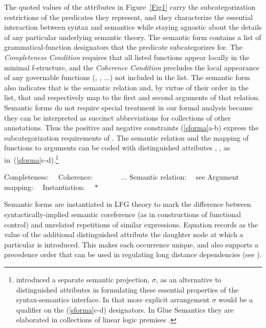 \documentclass[output=paper,hidelinks]{langscibook}
\begin{document}
The quoted values of the  attributes in Figure~\ref{Fig1} carry the subcategorization restrictions of the predicates they represent, and they characterize the essential interaction between syntax and semantics while staying agnostic about the details of any particular underlying semantic theory. The semantic form  contains a list of grammatical-function designators that the predicate subcategorizes for.  The \emph{Completeness Condition} requires that all listed functions appear locally in the minimal f-structure, and the \emph{Coherence Condition} precludes the local appearance of any governable functions (, , ...) not included in the list. The semantic form also indicates that  is the semantic relation and, by virtue of their order in the list, that   and  respectively map to the first and second arguments of that relation. Semantic forms do not require special treatment in our formal analysis because they can be interpreted as succinct abbreviations for collections of other annotations. Thus the positive and negative constraints \mbox{(\ref{sforma}a-b)} express the subcategorization requirements of .   The semantic relation and the mapping of functions to arguments can be coded with distinguished attributes , ,  as in~\mbox{(\ref{sforma}c-d)}.\footnote{\citet{HalvorsenKaplan1988} introduced a separate semantic projection, $\sigma$, as an alternative to distinguished attributes in formulating these essential properties of the syntax-semantics interface. In that more explicit arrangement $\sigma$ would be a qualifier on the (\ref{sforma}c-d) designators.  In Glue Semantics they are elaborated in collections of linear logic premises \citep{dalrympleetal93,Dalrymple:Glue}.}

\ea\label{sforma}
\ea\label{ex:computational:completeness} Completeness:\ \   \hsp{1em} 
\ex\label{ex:computational:coherence} Coherence:\ \    \ \    \ \    ...
\ex\label{ex:computational:relation} Semantic relation:\ \    {see}
\ex\label{ex:computational:argmapping} Argument mapping:\ \  
\ex\label{ex:computational:instantiation} Instantiation:\ \   {\mbox{\small $*$}}
\z\z

\noindent Semantic forms are instantiated in LFG theory to mark the difference between syntactically-implied semantic coreference (as in constructions of functional control) and unrelated repetitions of similar expressions. Equation  records as the value of the additional distinguished attribute  the daughter node at which a particular \PRED is introduced.  This makes each occurrence unique, and also supports a precedence order that can be used in regulating long distance dependencies (see ).
\end{document}
